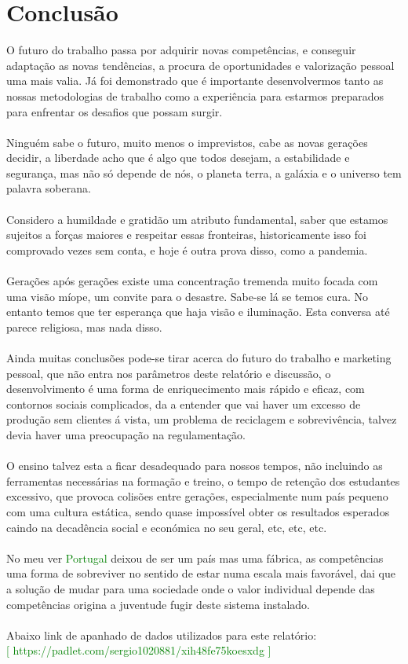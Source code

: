 \chapter{Conclusão}
\qquad O futuro do trabalho passa por adquirir novas competências, e conseguir adaptação as novas tendências, a procura de oportunidades e valorização pessoal uma mais valia. Já foi demonstrado que é importante desenvolvermos tanto as nossas metodologias de trabalho como a experiência para estarmos preparados para enfrentar os desafios que possam surgir. \\
\\
Ninguém sabe o futuro, muito menos o imprevistos, cabe as novas gerações decidir, a liberdade acho que é algo que todos desejam, a estabilidade e segurança, mas não só depende de nós, o planeta terra, a galáxia e o universo tem palavra soberana.\\
\\
Considero a humildade e gratidão um atributo fundamental, saber que estamos sujeitos a forças maiores e respeitar essas fronteiras, historicamente isso foi comprovado vezes sem conta, e hoje é outra prova disso, como a pandemia.\\
\\
Gerações após gerações existe uma concentração tremenda muito focada com uma visão míope, um convite para o desastre. Sabe-se lá se temos cura. No entanto temos que ter esperança que haja visão e iluminação.
Esta conversa até parece religiosa, mas nada disso.\\
\\
Ainda muitas conclusões pode-se tirar acerca do futuro do trabalho e marketing pessoal, que não entra nos parâmetros deste relatório e discussão, o desenvolvimento é uma forma de enriquecimento mais rápido e eficaz, com contornos sociais complicados, da a entender que vai haver um excesso de produção sem clientes á vista, um problema de reciclagem e sobrevivência, talvez devia haver uma preocupação na  regulamentação.\\
\\
O ensino talvez esta a ficar desadequado para nossos tempos, não incluindo as ferramentas necessárias na formação e treino, o tempo de retenção dos estudantes excessivo, que provoca colisões entre gerações, especialmente num país pequeno com uma cultura estática, sendo quase impossível obter os resultados esperados caindo na decadência social e económica no seu geral, etc, etc, etc.\\
\\
No meu ver \textcolor{green}{Portugal} deixou de ser um país mas uma fábrica, as competências uma forma de sobreviver no sentido de estar numa escala mais favorável, dai que a solução de mudar para uma sociedade onde o valor individual depende das competências origina a juventude fugir deste sistema instalado.\\
\\
Abaixo link de apanhado de dados utilizados para este relatório:\\ \textcolor{green}{\small [ https://padlet.com/sergio1020881/xih48fe75koesxdg ]}
